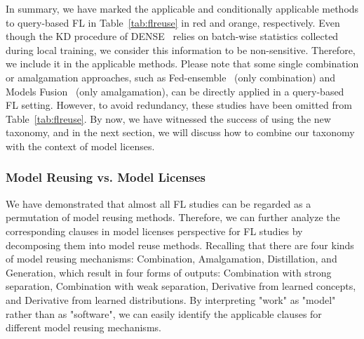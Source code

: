 
In summary, we have marked the applicable and conditionally applicable methods to query-based FL in Table~\ref{tab:flreuse} in red and orange, respectively.
Even though the KD procedure of DENSE~\cite{zhang2022dense} relies on batch-wise statistics collected during local training, we consider this information to be non-sensitive. 
Therefore, we include it in the applicable methods.
Please note that some single combination or amalgamation approaches, such as Fed-ensemble~\cite{shi2023fed} (only combination) and Models Fusion~\cite{yurochkin2019bayesian, yurochkin2019statistical, lam2021model} (only amalgamation), can be directly applied in a query-based FL setting. 
However, to avoid redundancy, these studies have been omitted from Table~\ref{tab:flreuse}.
By now, we have witnessed the success of using the new taxonomy, and in the next section, we will discuss how to combine our taxonomy with the context of model licenses.


\subsubsection{Model Reusing vs. Model Licenses}

We have demonstrated that almost all FL studies can be regarded as a permutation of model reusing methods. 
Therefore, we can further analyze the corresponding clauses in model licenses perspective for FL studies by decomposing them into model reuse methods.
Recalling that there are four kinds of model reusing mechanisms: Combination, Amalgamation, Distillation, and Generation, which result in four forms of outputs: Combination with strong separation, Combination with weak separation, Derivative from learned concepts, and Derivative from learned distributions.
By interpreting "work" as "model" rather than as "software", we can easily identify the applicable clauses for different model reusing mechanisms.

